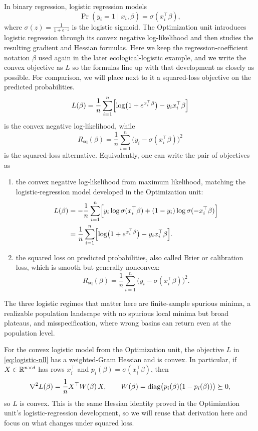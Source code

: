 \documentclass[11pt]{article}
\begin{document}
In binary regression, logistic regression models
\[
\Pr(y_i=1\mid x_i,\beta)=\sigma(x_i^\top\beta),
\]
where $\sigma(z)=\frac{1}{1+e^{-z}}$ is the logistic sigmoid.
The Optimization unit introduces logistic regression through its convex negative log-likelihood and then studies the resulting gradient and Hessian formulas.
Here we keep the regression-coefficient notation $\beta$ used again in the later ecological-logistic example, and we write the convex objective as $L$ so the formulas line up with that development as closely as possible.
For comparison, we will place next to it a squared-loss objective on the predicted probabilities.
\[
L(\beta)
=
\frac{1}{n}\sum_{i=1}^n \Bigl[\log\bigl(1+e^{x_i^\top\beta}\bigr) - y_i x_i^\top \beta\Bigr]
\]
is the convex negative log-likelihood, while
\[
R_{\mathrm{sq}}(\beta)
= \frac{1}{n}\sum_{i=1}^n \bigl(y_i-\sigma(x_i^\top\beta)\bigr)^2
\]
is the squared-loss alternative.
Equivalently, one can write the pair of objectives as
\begin{enumerate}[leftmargin=*]
  \item the convex negative log-likelihood from maximum likelihood, matching the logistic-regression model developed in the Optimization unit:
  \begin{equation}
    \begin{aligned}
      L(\beta)
      &=
      -\frac{1}{n}\sum_{i=1}^n \Bigl[y_i\log \sigma(x_i^\top\beta) + (1-y_i)\log \sigma(-x_i^\top\beta)\Bigr] \\
      &=
      \frac{1}{n}\sum_{i=1}^n \Bigl[\log\bigl(1+e^{x_i^\top\beta}\bigr) - y_i x_i^\top \beta\Bigr].
    \end{aligned}
    \label{eq:logistic-nll}
  \end{equation}
  \item the squared loss on predicted probabilities, also called Brier or calibration loss, which is smooth but generally nonconvex:
  \begin{equation}
    R_{\mathrm{sq}}(\beta)
    = \frac{1}{n}\sum_{i=1}^n \bigl(y_i-\sigma(x_i^\top\beta)\bigr)^2.
    \label{eq:logistic-mse}
\end{equation}
\end{enumerate}

The three logistic regimes that matter here are finite-sample spurious minima, a realizable population landscape with no spurious local minima but broad plateaus, and misspecification, where wrong basins can return even at the population level.

For the convex logistic model from the Optimization unit, the objective $L$ in \eqref{eq:logistic-nll} has a weighted-Gram Hessian and is convex.
In particular, if $X\in\mathbb{R}^{n\times d}$ has rows $x_i^\top$ and $p_i(\beta)=\sigma(x_i^\top\beta)$, then
\begin{equation}
  \nabla^2 L(\beta)
  =\frac{1}{n}X^\top W(\beta)\,X,
  \qquad
  W(\beta)=\mathrm{diag}\bigl(p_i(\beta)(1-p_i(\beta))\bigr)\succeq 0,
  \label{eq:logistic-nll-hess}
\end{equation}
so $L$ is convex.
This is the same Hessian identity proved in the Optimization unit's logistic-regression development, so we will reuse that derivation here and focus on what changes under squared loss.
\end{document}
